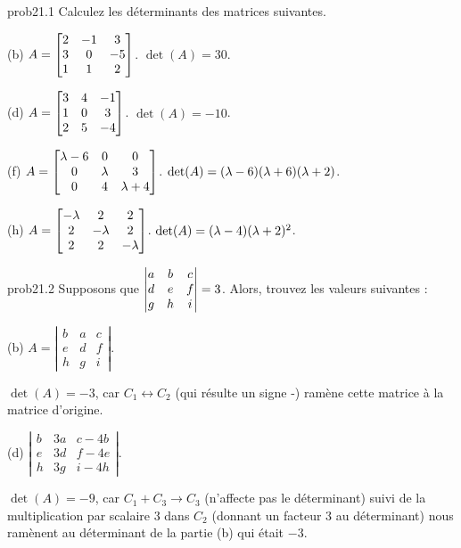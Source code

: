 
\begin{sol}{prob21.1} Calculez les déterminants des matrices suivantes. 
\medskip

(b) $A=\bmatrix 
2&-1&3\\3&0&-5\\1&1&2 \endbmatrix $.
\soln  $\det(A)=30$.

\medskip
(d) $A=\bmatrix 3&4&-
1\\1&0&3\\2&5&-4\endbmatrix$.
\soln  $\det(A)= -10$.

\medskip
(f) $A=\bmatrix \lambda-6&0&0\\0&\lambda&3\\0&4&\lambda+4\endbmatrix $.
\soln $\det(A)= (\lambda -6)(\lambda +6)(\lambda +2)$.
\medskip
 
(h) $A=\bmatrix
-\lambda&2&2\\ 2&-\lambda&2\\ 2&2&-\lambda \endbmatrix$.
\soln $\det(A)= (\lambda -4)(\lambda +2)^2$.
\medskip
  
\end{sol}

\bigskip
\begin{sol}{prob21.2} Supposons que $\left|\begin{matrix} a&b&c\cr d&e&f\cr g&h&i\end{matrix} \right|=3$. Alors, 
trouvez les valeurs suivantes :
\medskip

(b) $A=\left|\begin{matrix}  b&a&c\\ e&d&f\\ h&g&i\end{matrix}\right|$.

\soln $\det(A)= -3$, car $C_1 \leftrightarrow C_2$ (qui r\'esulte un signe -) ramène cette matrice à la matrice d'origine.
\medskip

(d) $\left|\begin{matrix}  b&3a&c-4b\\ e&3d&f-4e\\ h&3g&i-4h\end{matrix}\right|$.

\soln $\det(A)= -9$, car $C_1+C_3\to C_3$ (n'affecte pas le d\'eterminant) suivi de la multiplication par scalaire $3$ dans $C_2$ (donnant un facteur $3$ au déterminant) nous ramènent au déterminant de la partie (b) qui était $-3$.
\medskip

\end{sol}

